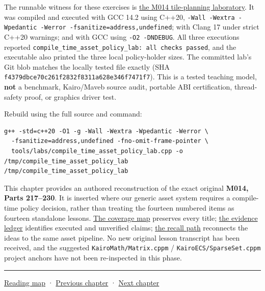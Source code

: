 The runnable witness for these exercises is \hyperref[source-file-f5eb017280bb6b2ae6b1475d]{the M014 tile-planning laboratory}. It was compiled and executed with GCC 14.2 using C++20, \texttt{-Wall\ -Wextra\ -Wpedantic\ -Werror\ -fsanitize=address,undefined}; with Clang 17 under strict C++20 warnings; and with GCC using \texttt{-O2\ -DNDEBUG}. All three executions reported \texttt{compile\_time\_asset\_policy\_lab:\ all\ checks\ passed}, and the executable also printed the three local policy-holder sizes. The committed lab's Git blob matches the locally tested file exactly (SHA \texttt{f4379dbce70c261f2832f8311a628e346f7471f7}). This is a tested teaching model, \textbf{not} a benchmark, Kairo/Maveb source audit, portable ABI certification, thread-safety proof, or graphics driver test.

Rebuild using the full source and command:

\begin{verbatim}
g++ -std=c++20 -O1 -g -Wall -Wextra -Wpedantic -Werror \
  -fsanitize=address,undefined -fno-omit-frame-pointer \
  tools/labs/compile_time_asset_policy_lab.cpp -o /tmp/compile_time_asset_policy_lab
/tmp/compile_time_asset_policy_lab
\end{verbatim}

This chapter provides an authored reconstruction of the exact original \textbf{M014, Parts 217--230}. It is inserted where our generic asset system requires a compile-time policy decision, rather than treating the fourteen numbered items as fourteen standalone lessons. \hyperref[appendix-fd090d982a15-m014-parts-217230-one-tile-planner-and-its-compile-time-policy-decisions]{The coverage map} preserves every title; \hyperref[appendix-a103e7846d21-phase-4-additive-reconstruction-m014-parts-217230]{the evidence ledger} identifies executed and unverified claims; \hyperref[appendix-960160274237-the-tile-planner-makes-a-choice-m014-reconstruction]{the recall path} reconnects the ideas to the same asset pipeline. No new original lesson transcript has been received, and the suggested \texttt{KairoMath/Matrix.cppm} / \texttt{KairoECS/SparseSet.cppm} project anchors have not been re-inspected in this phase.

\begin{center}\rule{0.5\linewidth}{0.5pt}\end{center}

\hyperref[volume-reading-map]{Reading map} · \hyperref[01-foundations-i-ch004]{Previous chapter} · \hyperref[01-foundations-i-ch006]{Next chapter}
